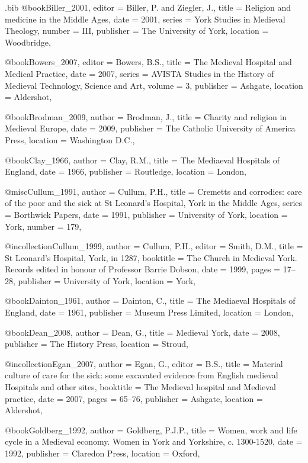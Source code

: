 \begin{filecontents}{\IJSRAidentifier.bib}
@book{Biller_2001,
	editor = {Biller, P. and Ziegler, J.},
	title = {Religion and medicine in the Middle Ages},
	date = {2001},
	series = {York Studies in Medieval Theology},
	number = {III},
	publisher = {The University of York},
	location = {Woodbridge},
}

@book{Bowers_2007,
	editor = {Bowers, B.S.},
	title = {The Medieval Hospital and Medical Practice},
	date = {2007},
	series = {AVISTA Studies in the History of Medieval Technology, Science and Art},
	volume = {3},
	publisher = {Ashgate},
	location = {Aldershot},
}

@book{Brodman_2009,
	author = {Brodman, J.},
	title = {Charity and religion in Medieval Europe},
	date = {2009},
	publisher = {The Catholic University of America Press},
	location = {Washington D.C.},
}

@book{Clay_1966,
	author = {Clay, R.M.},
	title = {The Mediaeval Hospitals of England},
	date = {1966},
	publisher = {Routledge},
	location = {London},
}

@misc{Cullum_1991,
	author = {Cullum, P.H.},
	title = {Cremetts and corrodies: care of the poor and the sick at St Leonard’s Hospital, York in the Middle Ages},
	series = {Borthwick Papers},
	date = {1991},
	publisher = {University of York},
	location = {York},
	number = {179},
}

@incollection{Cullum_1999,
	author = {Cullum, P.H.},
	editor = {Smith, D.M.},
	title = {St Leonard’s Hospital, York, in 1287},
	booktitle = {The Church in Medieval York. Records edited in honour of Professor Barrie Dobson},
	date = {1999},
	pages = {17--28},
	publisher = {University of York},
	location = {York},
}

@book{Dainton_1961,
	author = {Dainton, C.},
	title = {The Mediaeval Hospitals of England},
	date = {1961},
	publisher = {Museum Press Limited},
	location = {London},
}

@book{Dean_2008,
	author = {Dean, G.},
	title = {Medieval York},
	date = {2008},
	publisher = {The History Press},
	location = {Stroud},
}

@incollection{Egan_2007,
	author = {Egan, G.},
	editor = {B.S.},
	title = {Material culture of care for the sick: some excavated evidence from English medieval Hospitals and other sites},
	booktitle = {The Medieval hospital and Medieval practice},
	date = {2007},
	pages = {65--76},
	publisher = {Ashgate},
	location = {Aldershot},
}

@book{Goldberg_1992,
	author = {Goldberg, P.J.P.},
	title = {Women, work and life cycle in a Medieval economy. Women in York and Yorkshire, c. 1300-1520},
	date = {1992},
	publisher = {Claredon Press},
	location = {Oxford},
}


\end{filecontents}
